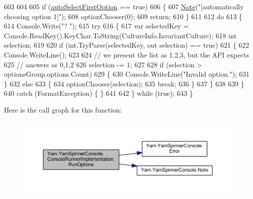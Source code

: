 \begin{DoxyCode}
603 
604 
605                 \textcolor{keywordflow}{if} (\hyperlink{a00056_a09a552ee9ff58cb3c995f8ecba1592b6}{autoSelectFirstOption} == \textcolor{keyword}{true})
606                 \{
607                     \hyperlink{a00195_a939cc9e943c574b36c6af93e9c772702}{Note}(\textcolor{stringliteral}{"[automatically choosing option 1]"});
608                     optionChooser(0);
609                     \textcolor{keywordflow}{return};
610                 \}
611 
612                 \textcolor{keywordflow}{do}
613                 \{
614                     Console.Write(\textcolor{stringliteral}{"? "});
615                     \textcolor{keywordflow}{try}
616                     \{
617                         var selectedKey = Console.ReadKey().KeyChar.ToString(CultureInfo.InvariantCulture);
618                         \textcolor{keywordtype}{int} selection;
619 
620                         \textcolor{keywordflow}{if} (\textcolor{keywordtype}{int}.TryParse(selectedKey, out selection) == \textcolor{keyword}{true})
621                         \{
622                             Console.WriteLine();
623 
624                             \textcolor{comment}{// we present the list as 1,2,3, but the API expects}
625                             \textcolor{comment}{// answers as 0,1,2}
626                             selection -= 1;
627 
628                             \textcolor{keywordflow}{if} (selection > optionsGroup.options.Count)
629                             \{
630                                 Console.WriteLine(\textcolor{stringliteral}{"Invalid option."});
631                             \}
632                             \textcolor{keywordflow}{else}
633                             \{
634                                 optionChooser(selection);
635                                 \textcolor{keywordflow}{break};
636                             \}
637                         \}
638 
639                     \}
640                     \textcolor{keywordflow}{catch} (FormatException) \{ \}
641 
642                 \} \textcolor{keywordflow}{while} (\textcolor{keyword}{true});
643             \}
\end{DoxyCode}


Here is the call graph for this function\-:
\nopagebreak
\begin{figure}[H]
\begin{center}
\leavevmode
\includegraphics[width=350pt]{a00056_a62674694fa65e5ae8c0c0da4fbceda51_cgraph}
\end{center}
\end{figure}


